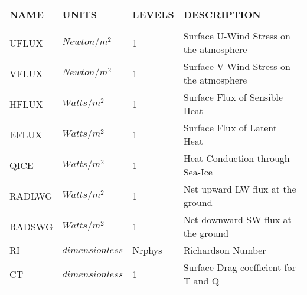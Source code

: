 \begin{tabular}{llll}
\hline\hline
 NAME & UNITS & LEVELS & DESCRIPTION \\
\hline

&\\
 UFLUX    &   $Newton/m^2$  &    1  
         &\begin{minipage}[t]{3in}
          {Surface U-Wind Stress on the atmosphere}
         \end{minipage}\\
 VFLUX    &   $Newton/m^2$  &    1  
         &\begin{minipage}[t]{3in}
          {Surface V-Wind Stress on the atmosphere}
         \end{minipage}\\
 HFLUX    &   $Watts/m^2$  &    1  
         &\begin{minipage}[t]{3in}
          {Surface Flux of Sensible Heat}
         \end{minipage}\\
 EFLUX    &   $Watts/m^2$  &    1  
         &\begin{minipage}[t]{3in}
          {Surface Flux of Latent Heat}
         \end{minipage}\\
 QICE     &   $Watts/m^2$  &    1  
         &\begin{minipage}[t]{3in}
          {Heat Conduction through Sea-Ice}
         \end{minipage}\\
 RADLWG   &   $Watts/m^2$ &    1  
         &\begin{minipage}[t]{3in}
          {Net upward LW flux at the ground}
         \end{minipage}\\
 RADSWG   &   $Watts/m^2$  &    1 
         &\begin{minipage}[t]{3in}
          {Net downward SW flux at the ground} 
         \end{minipage}\\
 RI       &  $dimensionless$ &  Nrphys 
         &\begin{minipage}[t]{3in}
          {Richardson Number}
         \end{minipage}\\
 CT       &  $dimensionless$ &  1 
         &\begin{minipage}[t]{3in}
          {Surface Drag coefficient for T and Q}
         \end{minipage}\\

\end{tabular}
